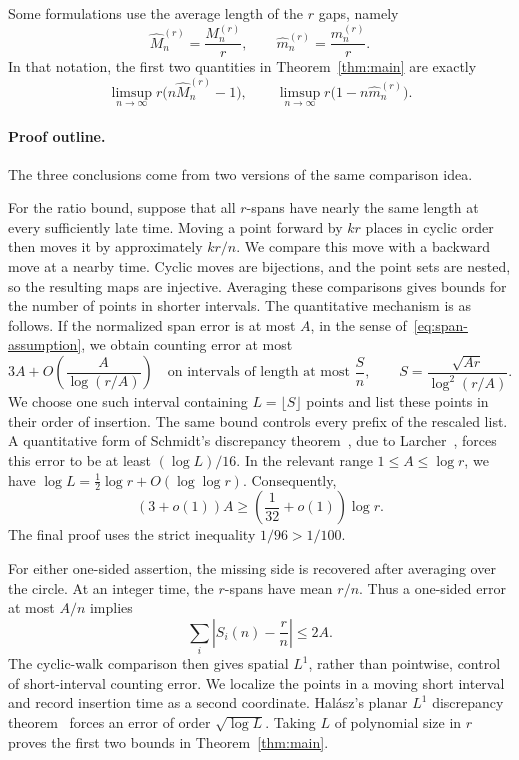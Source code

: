 \documentclass[11pt]{article}
\theoremstyle{remark}
\numberwithin{equation}{section}
\begin{document}
Some formulations use the average length of the $r$ gaps, namely
\[
  \widehat M_n^{(r)}=\frac{M_n^{(r)}}r,
  \qquad
  \widehat m_n^{(r)}=\frac{m_n^{(r)}}r.
\]
In that notation, the first two quantities in Theorem~\ref{thm:main} are
exactly
\[
  \limsup_{n\to\infty}r\bigl(n\widehat M_n^{(r)}-1\bigr),
  \qquad
  \limsup_{n\to\infty}r\bigl(1-n\widehat m_n^{(r)}\bigr).
\]
\paragraph{Proof outline.}
The three conclusions come from two versions of the same comparison idea.

For the ratio bound, suppose that all $r$-spans have nearly the same length
at every sufficiently late time. Moving a point forward by $kr$ places in
cyclic order then moves
it by approximately $kr/n$. We compare this move with a backward move at a
nearby time. Cyclic moves are bijections, and the point sets are nested, so
the resulting maps are injective. Averaging these comparisons gives bounds
for the number of points in shorter intervals.
The quantitative mechanism is as follows. If the normalized span error is
at most $A$, in the sense of~\eqref{eq:span-assumption}, we obtain counting
error at most
\[
  3A+O\!\left(\frac{A}{\log(r/A)}\right)
  \quad\text{on intervals of length at most }\frac Sn,
  \qquad
  S=\frac{\sqrt{Ar}}{\log^2(r/A)}.
\]
We choose one such interval containing $L=\lfloor S\rfloor$ points and list
these points in their order of insertion. The same bound controls every
prefix of the rescaled list. A quantitative
form of Schmidt's discrepancy theorem~\cite{schmidt}, due to
Larcher~\cite{larcher}, forces this error to be at least $(\log L)/16$.
In the relevant range $1\leq A\leq\log r$, we have
$\log L=\tfrac12\log r+O(\log\log r)$. Consequently,
\[
  (3+o(1))A\geq\left(\frac1{32}+o(1)\right)\log r.
\]
The final proof uses the strict inequality $1/96>1/100$.

For either one-sided assertion, the missing side is recovered after
averaging over the circle. At an integer time, the $r$-spans have mean
$r/n$. Thus a one-sided error at most $A/n$ implies
\[
  \sum_i\left|S_i(n)-\frac rn\right|\leq2A.
\]
The cyclic-walk comparison then gives spatial $L^1$, rather than pointwise,
control of short-interval counting error. We localize the points in a moving
short interval and record insertion time as a second coordinate. Hal\'asz's
planar $L^1$ discrepancy theorem~\cite{halasz} forces an error of order
$\sqrt{\log L}$. Taking $L$ of polynomial size in $r$ proves the first two
bounds in Theorem~\ref{thm:main}.
\end{document}
